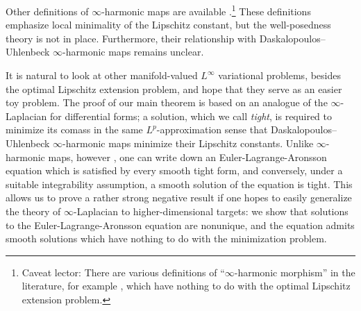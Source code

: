 \documentclass[reqno,11pt]{amsart}
\newcommand{\dfn}[1]{\emph{#1}\index{#1}}
\theoremstyle{definition}
\numberwithin{equation}{section}
\begin{document}
Other definitions of $\infty$-harmonic maps are available \cite{Sheffield12}.\footnote{Caveat lector: There are various definitions of ``$\infty$-harmonic morphism'' in the literature, for example \cite{Ou12}, which have nothing to do with the optimal Lipschitz extension problem.}
These definitions emphasize local minimality of the Lipschitz constant, but the well-posedness theory is not in place.
Furthermore, their relationship with Daskalopoulos--Uhlenbeck $\infty$-harmonic maps remains unclear.

It is natural to look at other manifold-valued $L^\infty$ variational problems, besides the optimal Lipschitz extension problem, and hope that they serve as an easier toy problem.
The proof of our main theorem is based on an analogue of the $\infty$-Laplacian for differential forms; a solution, which we call \dfn{tight}, is required to minimize its comass in the same $L^p$-approximation sense that Daskalopoulos--Uhlenbeck $\infty$-harmonic maps minimize their Lipschitz constants.
Unlike $\infty$-harmonic maps, however \cite{Sheffield12}, one can write down an Euler-Lagrange-Aronsson equation which is satisfied by every smooth tight form, and conversely, under a suitable integrability assumption, a smooth solution of the equation is tight.
This allows us to prove a rather strong negative result if one hopes to easily generalize the theory of $\infty$-Laplacian to higher-dimensional targets: we show that solutions to the Euler-Lagrange-Aronsson equation are nonunique, and the equation admits smooth solutions which have nothing to do with the minimization problem.

\end{document}
